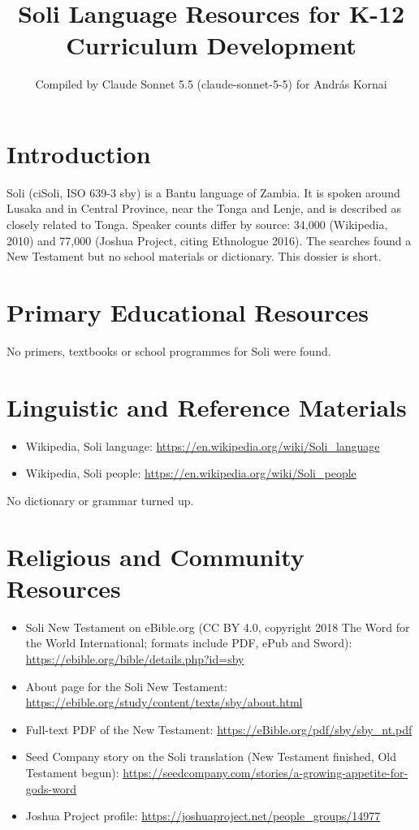 \documentclass[12pt]{article}
\title{Soli Language Resources for K-12 Curriculum Development}
\author{Compiled by Claude Sonnet 5.5 (claude-sonnet-5-5) for Andr\'as Kornai}
\date{}
\begin{document}
\maketitle

\section{Introduction}
Soli (ciSoli, ISO 639-3 sby) is a Bantu language of Zambia. It is spoken around Lusaka and in Central Province, near the Tonga and Lenje, and is described as closely related to Tonga. Speaker counts differ by source: 34,000 (Wikipedia, 2010) and 77,000 (Joshua Project, citing Ethnologue 2016). The searches found a New Testament but no school materials or dictionary. This dossier is short.

\section{Primary Educational Resources}
No primers, textbooks or school programmes for Soli were found.

\section{Linguistic and Reference Materials}
\begin{itemize}
\item Wikipedia, Soli language: \url{https://en.wikipedia.org/wiki/Soli_language}
\item Wikipedia, Soli people: \url{https://en.wikipedia.org/wiki/Soli_people}
\end{itemize}
No dictionary or grammar turned up.

\section{Religious and Community Resources}
\begin{itemize}
\item Soli New Testament on eBible.org (CC BY 4.0, copyright 2018 The Word for the World International; formats include PDF, ePub and Sword): \url{https://ebible.org/bible/details.php?id=sby}
\item About page for the Soli New Testament: \url{https://ebible.org/study/content/texts/sby/about.html}
\item Full-text PDF of the New Testament: \url{https://eBible.org/pdf/sby/sby_nt.pdf}
\item Seed Company story on the Soli translation (New Testament finished, Old Testament begun): \url{https://seedcompany.com/stories/a-growing-appetite-for-gods-word}
\item Joshua Project profile: \url{https://joshuaproject.net/people_groups/14977}
\end{itemize}
\end{document}
